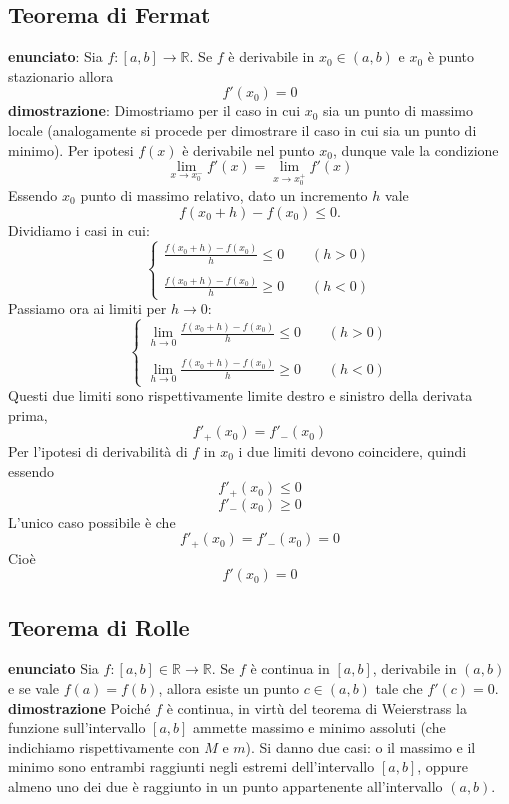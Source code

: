 \documentclass[a4paper, 9pt]{report}
\begin{document}
\subsection*{Teorema di Fermat}
\textbf{enunciato}:\newline
Sia $f:[a,b]\rightarrow \mathbb{R}$. Se $f$ è derivabile in $x_0 \in(a,b)$ e $x_0$ è punto stazionario allora
\[
    f'(x_0) = 0
\]
\textbf{dimostrazione}:\newline
Dimostriamo per il caso in cui $x_0$ sia un punto di massimo locale (analogamente si procede per dimostrare il caso in cui sia un punto di minimo). \newline
Per ipotesi $f(x)$ è derivabile nel punto $x_0$, dunque vale la condizione
\[
    \lim_{x\rightarrow x_0^-} f'(x) = \lim_{x\rightarrow x_0^+} f'(x)
\]
Essendo $x_0$ punto di massimo relativo, dato un incremento $h$ vale 
\[
    f(x_0 +h) - f(x_0) \leq 0.
\]
Dividiamo i casi in cui:
\[
    \begin{cases}
        \frac{f(x_0 +h) - f(x_0)}{h} \leq 0 \;\;\;\; &(h>0)\\
        \\
        \frac{f(x_0 +h) - f(x_0)}{h} \geq 0 &(h<0)
    \end{cases}
\]
Passiamo ora ai limiti per $h \rightarrow 0$:
\[
    \begin{cases}
        \lim_{h\rightarrow 0}\frac{f(x_0 +h) - f(x_0)}{h} \leq 0 \;\;\;\; &(h>0)\\
        \\
        \lim_{h\rightarrow 0}\frac{f(x_0 +h) - f(x_0)}{h} \geq 0 &(h<0)
    \end{cases}
\]
Questi due limiti sono rispettivamente limite destro e sinistro della derivata prima,
\[
    f'_+(x_0) = f'_-(x_0)
\]
Per l'ipotesi di derivabilità di $f$ in $x_0$ i due limiti devono coincidere, quindi essendo
\[
    f'_+(x_0) \leq 0
\]
\[
    f'_-(x_0) \geq 0
\]
L'unico caso possibile è che
\[
    f'_+(x_0) = f'_-(x_0) = 0
\]
Cioè
\[
    f'(x_0) = 0
\]






\newpage
\subsection*{Teorema di Rolle}
\textbf{enunciato}\newline
Sia $f:[a,b] \in \mathbb{R} \rightarrow  \mathbb{R}$. Se $f$ è continua in $[a,b]$, derivabile in $(a,b)$ e se vale $f(a) = f(b)$, allora esiste un punto $c \in(a,b)$ tale che $f'(c) = 0$.\newline
\newline
\textbf{dimostrazione}\newline
Poiché $f$ è continua, in virtù del teorema di Weierstrass la funzione sull'intervallo $[a,b]$ ammette massimo e minimo assoluti (che indichiamo rispettivamente con $M$ e $m$). Si danno due casi: o il massimo e il minimo sono entrambi raggiunti negli estremi dell'intervallo $[a,b]$, oppure almeno uno dei due è raggiunto in un punto appartenente all'intervallo $(a,b)$.\newline
\end{document}
